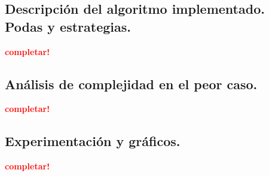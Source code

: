 \subsection{Descripción del algoritmo implementado. Podas y estrategias.}
\vspace*{0.3cm}
\textcolor{red}{\textbf{completar!}}



\newpage
\subsection{Análisis de complejidad en el peor caso.}
\vspace*{0.3cm}
\textcolor{red}{\textbf{completar!}}



\newpage
\subsection{Experimentación y gráficos.}
\vspace*{0.3cm}
\textcolor{red}{\textbf{completar!}}


